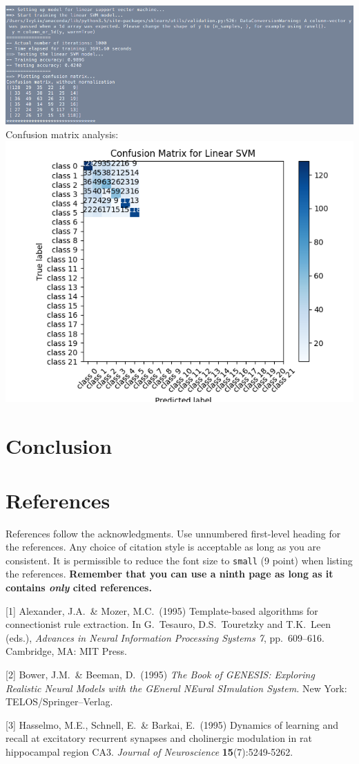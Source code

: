 \documentclass{article}
\begin{document}
\includegraphics[scale=0.4]{5.png}
\\
Confusion matrix analysis: 
\\
\includegraphics[scale=0.4]{linsvm_cm.png}

\section{Conclusion}

\section*{References}

References follow the acknowledgments. Use unnumbered first-level
heading for the references. Any choice of citation style is acceptable
as long as you are consistent. It is permissible to reduce the font
size to \verb+small+ (9 point) when listing the references. {\bf
  Remember that you can use a ninth page as long as it contains
  \emph{only} cited references.}
\medskip

\small

[1] Alexander, J.A.\ \& Mozer, M.C.\ (1995) Template-based algorithms
for connectionist rule extraction. In G.\ Tesauro, D.S.\ Touretzky and
T.K.\ Leen (eds.), {\it Advances in Neural Information Processing
  Systems 7}, pp.\ 609--616. Cambridge, MA: MIT Press.

[2] Bower, J.M.\ \& Beeman, D.\ (1995) {\it The Book of GENESIS:
  Exploring Realistic Neural Models with the GEneral NEural SImulation
  System.}  New York: TELOS/Springer--Verlag.

[3] Hasselmo, M.E., Schnell, E.\ \& Barkai, E.\ (1995) Dynamics of
learning and recall at excitatory recurrent synapses and cholinergic
modulation in rat hippocampal region CA3. {\it Journal of
  Neuroscience} {\bf 15}(7):5249-5262.
\end{document}
